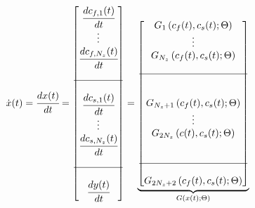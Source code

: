 \documentclass[../Article_Model_Parameters.tex]{subfiles}
\begin{document}
		{\footnotesize
			\begin{align*} \label{discretization}
				\dot{{\color{black}x}}(t) &= \cfrac{d {\color{black}x}(t)}{d t} = 
				\begin{bmatrix}
					\cfrac{d {\color{black}c_{f,1}}(t)}{d t} 	  \\
					\vdots					  \\
					\cfrac{d {\color{black}c_{f,N_z}}(t)}{d t} \\
					\\ \hline \\
					\cfrac{d {\color{black}c_{s,1}}(t)}{d t} 	  \\
					\vdots					  \\
					\cfrac{d {\color{black}c_{s,N_z}}(t)}{d t} \\
					\\ \hline \\
					\cfrac{d {\color{black}y}(t)}{d t}
				\end{bmatrix}
				=
				\underbrace{\begin{bmatrix}
						{\color{black}G_1} \left( {\color{black}c_f}(t),{\color{black}c_s}(t); {\color{black}\Theta} \right)\\ 
						\vdots\\ 
						{\color{black}G_{N_z}} \left( {\color{black}c_f}(t),{\color{black}c_s}(t); {\color{black}\Theta} \right)\\ 
						\\ \hline \\ \\
						{\color{black}G_{N_z+1}} \left( {\color{black}c_f}(t),{\color{black}c_s}(t); {\color{black}\Theta} \right)\\ 
						\vdots\\
						{\color{black}G_{2N_z}} \left( {\color{black}c}(t),{\color{black}c_s}(t); {\color{black}\Theta} \right)\\ 
						\\ \\ \hline \\
						{\color{black}G_{2N_z+2}} \left( {\color{black}c_f}(t),{\color{black}c_s}(t); {\color{black}\Theta} \right) 
				\end{bmatrix}}_{{\color{black}G} \left( {\color{black}x}(t); {\color{black}\Theta} \right)} 
		\end{align*} }
		
\end{document}
